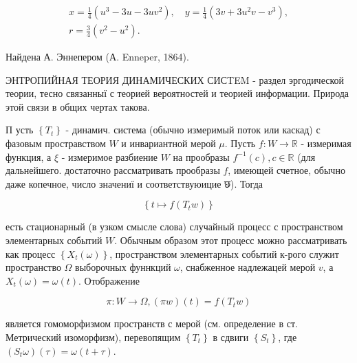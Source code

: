 \documentclass[10pt]{article}
\begin{document}
\[

\begin{gathered}

x=\frac{1}{4}\left(u^{3}-3 u-3 u v^{2}\right), \quad y=\frac{1}{4}\left(3 v+3 u^{2} v-v^{3}\right), \\

r=\frac{3}{4}\left(v^{2}-u^{2}\right) .

\end{gathered}

\]



Найдена А. Эннепером (А. Enneper, 1864).



ЭНТРОПИЙНАЯ ТЕОРИЯ ДИНАМИЧЕСКИХ СИСTEM - раздел эргодической теории, тесно связанныї с теорией вероятностей и теорией информации. Природа этой связи в общих чертах такова.



П усть $\left\{T_{t}\right\}$ - динамич. система (обычно измеримый поток или каскад) с фазовым простравством $W$ и инвариантной мерой $\mu$. Пусть $f: W \rightarrow \mathbb{R}$ - измеримая функция, а $\xi$ - измеримое разбиение $W$ на прообразы $f^{-1}(c), c \in \mathbb{R}$ (для дальнейшего. достаточно рассматривать прообразы $f$, имеющей счетное, обычно даже копечное, число значениї и соответствуюицие छ). Тогда



\[

\left\{t \longmapsto f\left(T_{t} w\right)\right\}

\]



есть стационарный (в узком смысле слова) случайный процесс с пространством элементарных событий $W$. Обычным образом этот процесс можно рассматривать как процесс $\left\{X_{t}(\omega)\right\}$, пространством элементарных событий к-рого служит пространство $\Omega$ выборочных фуннкций $\omega$, снабженное надлежацей мерой $v$, а $X_{t}(\omega)=\omega(t)$. Отображение



\[

\pi: W \longrightarrow \Omega,(\pi w)(t)=f\left(T_{t} w\right)

\]



является гомоморфизмом пространств с мерой (см. определение в ст. Метрический изоморфизм), перевопящим $\left\{T_{t}\right\}$ в сдвиги $\left\{S_{t}\right\}$, где $\left(S_{t} \omega\right)(\tau)=\omega(t+\tau)$.
\end{document}

